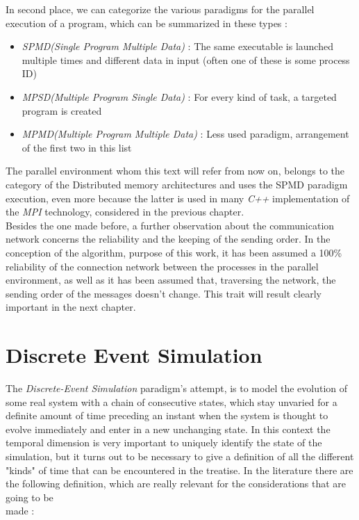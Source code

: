 \documentclass[12pt,a4paper,fleqn]{report}
\begin{document}
In second place, we can categorize the various paradigms for the parallel execution of a program, which can be summarized in these types :
\begin{itemize}
\item
\textit{SPMD(Single Program Multiple Data)} : The same executable is launched multiple times and different data in input (often one of these is some process ID)
\item
\textit{MPSD(Multiple Program Single Data)} : For every kind of task, a targeted program is created
\item
\textit{MPMD(Multiple Program Multiple Data)} : Less used paradigm, arrangement of the first two in this list
\end{itemize}
The parallel environment whom this text will refer from now on, belongs to the category of the Distributed memory architectures and uses the SPMD paradigm execution, even more because the latter is used in many \textit{C++} implementation of the \textit{MPI} technology, considered in the previous chapter. \\
	Besides the one made before, a further observation about the communication network concerns the reliability and the keeping of the sending order. In the conception of the algorithm, purpose of this work, it has been assumed a 100\% reliability of the connection network between the processes in the parallel environment, as well as it has been assumed that, traversing the network, the sending order of the messages doesn't change. This trait will result clearly important in the next chapter.
\section{Discrete Event Simulation}
The \textit{Discrete-Event Simulation} paradigm's attempt, is to model the evolution of some real system with a chain of consecutive states, which stay unvaried for a definite amount of time preceding an instant when the system is thought to evolve immediately and enter in a new unchanging state. In this context the temporal dimension is very important to uniquely identify the state of the simulation, but it turns out to be necessary to give a definition of all the different "kinds" of time that can be encountered in the treatise. In the literature \cite{0} there are the following definition, which are really relevant for the considerations that are going to be \\
made :
\newpage
\end{document}
